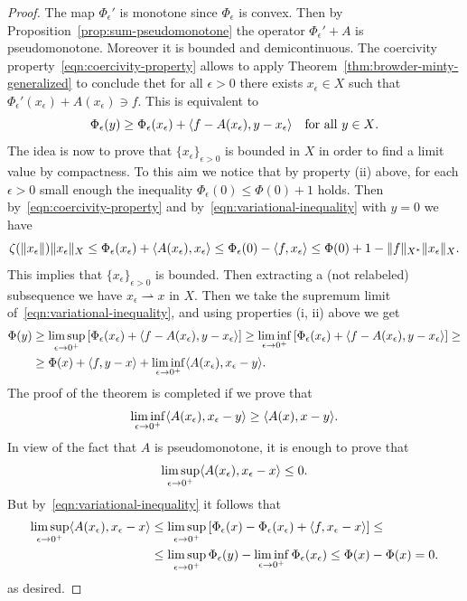 \documentclass[a4paper,10pt,oneside]{amsbook}
\numberwithin{section}{chapter}
\numberwithin{equation}{chapter}
\theoremstyle{definition}
\DeclarePairedDelimiter{\norm}{\lVert}{\rVert}
\DeclarePairedDelimiter{\dual}{\langle}{\rangle}
\begin{document}
\begin{proof}
The map $\Phi_\epsilon'$ is monotone since $\Phi_\epsilon$ is convex. Then by Proposition~\ref{prop:sum-pseudomonotone} the operator $\Phi_\epsilon'+A$ is pseudomonotone. Moreover it is bounded and demicontinuous. The coercivity property~\eqref{eqn:coercivity-property} allows to apply Theorem~\ref{thm:browder-minty-generalized} to conclude thet for all $\epsilon>0$ there exists $x_\epsilon\in X$ such that $\Phi_\epsilon'(x_\epsilon)+A(x_\epsilon)\ni f$. This is equivalent to
\begin{equation}
\label{eqn:variational-inequality}
\Phi_\epsilon(y)\ge\Phi_\epsilon(x_\epsilon)+\dual{f-A(x_\epsilon),y-x_\epsilon}\quad\text{for all $y\in X$}.
\end{equation}
The idea is now to prove that $\{x_\epsilon\}_{\epsilon>0}$ is bounded in $X$ in order to find a limit value by compactness. To this aim we notice that by property (ii) above, for each $\epsilon>0$ small enough the inequality $\Phi_\epsilon(0)\le\Phi(0)+1$ holds. Then by~\eqref{eqn:coercivity-property} and by~\eqref{eqn:variational-inequality} with $y=0$ we have
\[
\zeta(\norm{x_\epsilon})\norm{x_\epsilon}_X\le \Phi_\epsilon(x_\epsilon)+\dual{A(x_\epsilon),x_\epsilon}\le\Phi_\epsilon(0)-\dual{f,x_\epsilon}\le\Phi(0)+1-\norm{f}_{X^*}\norm{x_\epsilon}_X.
\]
This implies that $\{x_\epsilon\}_{\epsilon>0}$ is bounded. Then extracting a (not relabeled) subsequence we have $x_\epsilon\rightharpoonup x$ in $X$. Then we take the supremum limit of~\eqref{eqn:variational-inequality}, and using properties (i, ii) above we get
\[
\begin{split}
\Phi(y)&\ge\limsup_{\epsilon\to 0^+}\left[\Phi_\epsilon(x_\epsilon)+\dual{f-A(x_\epsilon),y-x_\epsilon}\right]\ge\liminf_{\epsilon\to 0^+}\left[\Phi_\epsilon(x_\epsilon)+\dual{f-A(x_\epsilon),y-x_\epsilon}\right]\ge\\
&\ge\Phi(x)+\dual{f,y-x}+\liminf_{\epsilon\to 0^+}\dual{A(x_\epsilon),x_\epsilon-y}.
\end{split}
\]
The proof of the theorem is completed if we prove that
\[
\liminf_{\epsilon\to 0^+}\dual{A(x_\epsilon),x_\epsilon-y}\ge\dual{A(x),x-y}.
\]
In view of the fact that $A$ is pseudomonotone, it is enough to prove that
\[
\limsup_{\epsilon\to 0^+}\dual{A(x_\epsilon),x_\epsilon-x}\le0.
\]
But by~\eqref{eqn:variational-inequality} it follows that
\[
\begin{split}
\limsup_{\epsilon\to 0^+}\dual{A(x_\epsilon),x_\epsilon-x}&\le\limsup_{\epsilon\to 0^+}\left[\Phi_\epsilon(x)-\Phi_\epsilon(x_\epsilon)+\dual{f,x_\epsilon-x}\right]\le\\
&\le\limsup_{\epsilon\to0^+}\Phi_\epsilon(y)-\liminf_{\epsilon\to0^+}\Phi_\epsilon(x_\epsilon)\le\Phi(x)-\Phi(x)=0.
\end{split}
\]
as desired.
\end{proof}
\end{document}
